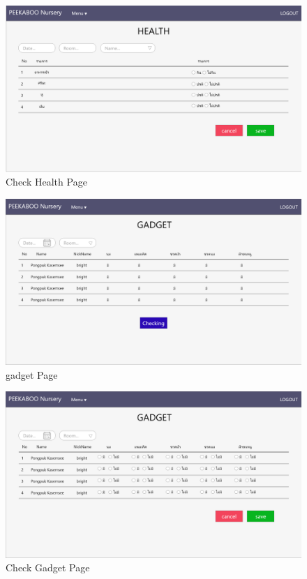 \begin{figure}
  \begin{center}
  \includegraphics[width=\linewidth]{images/HealthPageChecking.png}
  \end{center}
  \caption[Poem]{Check Health Page}
  \label{fig:CheckHealth}
  \end{figure}

\begin{figure}
  \begin{center}
  \includegraphics[width=\linewidth]{images/gadgetPage.png}
  \end{center}
  \caption[Poem]{gadget Page}
  \label{fig:Gadget}
  \end{figure}

\begin{figure}
  \begin{center}
  \includegraphics[width=\linewidth]{images/gadgetPageChecking.png}
  \end{center}
  \caption[Poem]{Check Gadget Page}
  \label{fig:CheckGadget}
  \end{figure}

